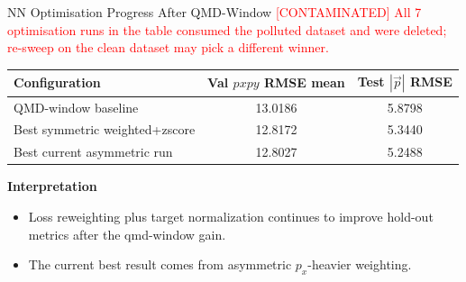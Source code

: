 \documentclass[aspectratio=169]{beamer}
\begin{document}
\begin{frame}{NN Optimisation Progress After QMD-Window \textcolor{red}{[CONTAMINATED]}}
\small
\textcolor{red}{All 7 optimisation runs in the table consumed the polluted
dataset and were deleted; re-sweep on the clean dataset may pick a different
winner.}
\begin{table}
\centering
\begin{tabular}{lcc}
\toprule
Configuration & Val \(pxpy\) RMSE mean & Test \(|\vec p|\) RMSE \\
\midrule
QMD-window baseline & 13.0186 & 5.8798 \\
Best symmetric weighted+zscore & 12.8172 & 5.3440 \\
Best current asymmetric run & 12.8027 & 5.2488 \\
\bottomrule
\end{tabular}
\end{table}

\textbf{Interpretation}
\begin{itemize}
\item Loss reweighting plus target normalization continues to improve hold-out metrics after the qmd-window gain.
\item The current best result comes from asymmetric \(p_x\)-heavier weighting.
\end{itemize}
\end{frame}
\end{document}
